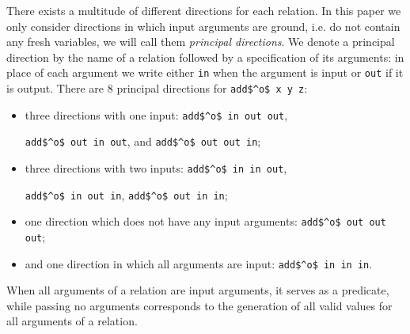 There exists a multitude of different directions for each relation.
In this paper we only consider directions in which input arguments are ground, i.e. do not contain any fresh variables, we will call them \emph{principal directions}.
We denote a principal direction by the name of a relation followed by a specification of its arguments: in place of each argument we write either \lstinline{in} when the argument is input or \lstinline{out} if it is output.
There are $8$ principal directions for \lstinline{add$^o$ x y z}:
\begin{itemize}
  \item three directions with one input: \lstinline{add$^o$ in out out},

  \lstinline{add$^o$ out in out}, and \lstinline{add$^o$ out out in};
  \item three directions with two inputs: \lstinline{add$^o$ in in out},

  \lstinline{add$^o$ in out in}, \lstinline{add$^o$ out in in};
  \item one direction which does not have any input arguments:
  \lstinline{add$^o$ out out out};
  \item and one direction in which all arguments are input:
  \lstinline{add$^o$ in in in}.
\end{itemize}

When all arguments of a relation are input arguments, it serves as a predicate, while passing no arguments corresponds to the generation of all valid values for all arguments of a relation.


